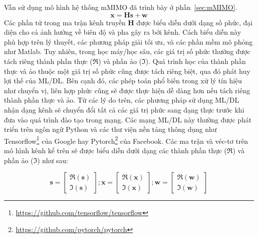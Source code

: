 Vẫn sử dụng mô hình hệ thống mMIMO đã trình bày ở phần~\ref{sec:mMIMO}.
\begin{equation}
    \mathbf{x} = \mathbf{H} \mathbf{s} + \mathbf{w}
\end{equation}
Các phần tử trong ma trận kênh truyền $\mathbf{H}$ được biểu diễn dưới dạng số phức, đại diện cho cả ảnh hưởng về biên độ và pha gây ra bởi kênh. Cách biểu diễn này phù hợp trên lý thuyết, các phương pháp giải tối ưu, và các phần mềm mô phỏng như Matlab. Tuy nhiên, trong học máy/học sâu, các giá trị số phức thường được tách riêng thành phần thực ($\Re$) và phần ảo ($\Im$).
Quá trình học của thành phần thực và ảo thuộc một giá trị số phức cũng được tách riêng biệt, qua đó phát huy lợi thế của ML/DL.
Bên cạnh đó, các phép toán phổ biến trong xử lý tín hiệu như chuyển vị, liên hợp phức cũng sẽ được thực hiện dễ dàng hơn nếu tách riêng thành phần thực và ảo.
Từ các lý do trên, các phương pháp sử dụng ML/DL nhận dạng kênh sẽ chuyển đổi tất cả các giá trị phức sang dạng thực trước khi đưa vào quá trình đào tạo trong mạng. Các mạng ML/DL này thường được phát triển trên ngôn ngữ Python và các thư viện nền tảng thông dụng như Tensorflow\footnote{\url{https://github.com/tensorflow/tensorflow}} của Google hay Pytorch\footnote{\url{https://github.com/pytorch/pytorch}} của Facebook. 
Các ma trận và véc-tơ trên mô hình kênh kể trên sẽ được biểu diễn dưới dạng các thành phần thực ($\Re$) và phần ảo ($\Im$) như sau:

\begin{equation}
\label{eq:matrixtras1}
    \mathbf{s}=\left[\begin{array}{l}
    \Re(\mathbf{s}) \\
    \Im(\mathbf{s})
    \end{array}\right] ;
    \mathbf{x}=\left[\begin{array}{l}
    \Re(\mathbf{x}) \\
    \Im(\mathbf{x})
    \end{array}\right] ; 
    \mathbf{w}=\left[\begin{array}{l}
    \Re(\mathbf{w}) \\
    \Im(\mathbf{w})
    \end{array}\right]
\end{equation}

